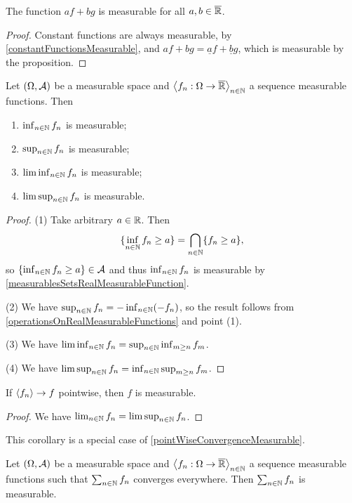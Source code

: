 \begin{corollary}
The function $af+bg$ is measurable for all $a,b\in\overline{\mathbb{R}}$.
\end{corollary}
\begin{proof}
Constant functions are always measurable, by \ref{constantFunctionsMeasurable}, and $af + bg = \underline{a}f + \underline{b}g$, which is measurable by the proposition.
\end{proof}

\begin{proposition} \label{limitOperationsOnRealMeasurableFunctions}
Let $\left( \Omega, \mathcal{A} \right)$ be a measurable space and $\left\langle f_n: \Omega \to \overline{\mathbb{R}} \right\rangle_{n\in\mathbb{N}}$ a sequence measurable functions. Then
\begin{enumerate}
\item $\inf_{n\in\mathbb{N}}f_n$ is measurable;
\item $\sup_{n\in\mathbb{N}}f_n$ is measurable;
\item $\liminf_{n\in\mathbb{N}}f_n$ is measurable;
\item $\limsup_{n\in\mathbb{N}}f_n$ is measurable.
\end{enumerate}
\end{proposition}
\begin{proof}
(1) Take arbitrary $a\in\mathbb{R}$. Then
\[ \{\inf_{n\in\mathbb{N}}f_n \geq a\} = \bigcap_{n\in\mathbb{N}}\{f_n \geq a\}, \]
so $\{\inf_{n\in\mathbb{N}}f_n \geq a\} \in \mathcal{A}$ and thus $\inf_{n\in\mathbb{N}}f_n$ is measurable by \ref{measurablesSetsRealMeasurableFunction}.

(2) We have $\sup_{n\in\mathbb{N}}f_n = -\inf_{n\in\mathbb{N}}(-f_n)$, so the result follows from \ref{operationsOnRealMeasurableFunctions} and point (1).

(3) We have $\liminf_{n\in\mathbb{N}}f_n = \sup_{n\in\mathbb{N}} \inf_{m\geq n}f_m$.

(4) We have $\limsup_{n\in\mathbb{N}}f_n = \inf_{n\in\mathbb{N}} \sup_{m\geq n}f_m$.
\end{proof}
\begin{corollary}
If $\left\langle f_n \right\rangle\to f$ pointwise, then $f$ is measurable.
\end{corollary}
\begin{proof}
We have $\lim_{n\in\mathbb{N}}f_n = \limsup_{n\in\mathbb{N}}f_n$.
\end{proof}
This corollary is a special case of \ref{pointWiseConvergenceMeasurable}.
\begin{corollary} \label{infiniteSumMeasurable}
Let $\left( \Omega, \mathcal{A} \right)$ be a measurable space and $\left\langle f_n: \Omega \to \overline{\mathbb{R}} \right\rangle_{n\in\mathbb{N}}$ a sequence measurable functions such that $\sum_{n\in\mathbb{N}}f_n$ converges everywhere. Then $\sum_{n\in\mathbb{N}}f_n$ is measurable.
\end{corollary}

